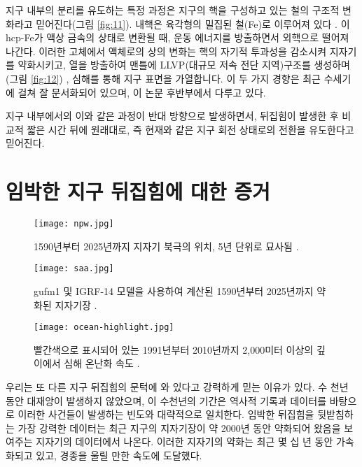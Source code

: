 \documentclass[10pt,twocolumn,letterpaper]{article}
\begin{document}
\begin{개요}
지구 내부의 분리를 유도하는 특정 과정은 지구의 핵을 구성하고 있는 철의 구조적 변화라고 믿어진다(그림 \ref{fig:11}). 내핵은 육각형의 밀집된 철(Fe)로 이루어져 있다 \cite{141}. 이 hcp-Fe가 액상 금속의  상태로 변환될 때,  운동 에너지를 방출하면서 외핵으로 떨어져 나간다. 이러한 고체에서 액체로의 상의 변화는 핵의 자기적 투과성을 감소시켜 지자기를 약화시키고, 열을 방출하여 맨틀에 LLVP(대규모 저속 전단 지역)구조를 생성하며(그림 \ref{fig:12}) \cite{38}, 심해를 통해 지구 표면을 가열합니다. 이 두 가지 경향은 최근 수세기에 걸쳐 잘 문서화되어 있으며, 이 논문 후반부에서 다루고 있다.

지구 내부에서의 이와 같은 과정이 반대 방향으로 발생하면서, 뒤집힘이 발생한 후 비교적 짧은 시간 뒤에 원래대로, 즉 현재와 같은 지구 회전 상태로의 전환을 유도한다고 믿어진다.

\section{임박한 지구 뒤집힘에 대한 증거}

\begin{figure}[t]
\begin{center}
   \texttt{[image: npw.jpg]}
\end{center}
   \caption{1590년부터 2025년까지 지자기 북극의 위치, 5년 단위로 묘사됨 \cite{142}.}
\label{fig:13}
\label{fig:onecol}
\end{figure}

\begin{figure*}[t]
\begin{center}
\texttt{[image: saa.jpg]}
\end{center}
   \caption{gufm1 및 IGRF-14 모델을 사용하여 계산된 1590년부터 2025년까지 약화된 지자기장 \cite{125,126}.}
\label{fig:14}
\end{figure*}

\begin{figure}[t]
\begin{center}
   \texttt{[image: ocean-highlight.jpg]}
\end{center}
   \caption{빨간색으로 표시되어 있는 1991년부터 2010년까지 2,000미터 이상의 깊이에서 심해 온난화 속도 \cite{132}.}
\label{fig:15}
\label{fig:onecol}
\end{figure}

우리는 또 다른 지구 뒤집힘의 문턱에 와 있다고 강력하게 믿는 이유가 있다. 수 천년 동안 대재앙이 발생하지 않았으며, 이 수천년의 기간은 역사적 기록과 데이터를 바탕으로 이러한 사건들이 발생하는 빈도와 대략적으로 일치한다. 임박한 뒤집힘을 뒷받침하는 가장 강력한 데이터는 최근 지구의 지자기장이 약 2000년 동안 약화되어 왔음을 보여주는 지자기의 데이터에서 나온다. 이러한 지자기의 약화는 최근 몇 십 년 동안 가속화되고 있고, 경종을 울릴 만한 속도에 도달했다.


\end{개요}
\end{document}
